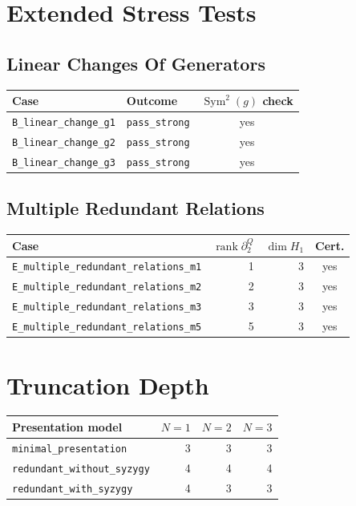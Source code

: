 \documentclass[11pt]{article}
\begin{document}
\section{Extended Stress Tests}
\subsection{Linear Changes Of Generators}
\begin{center}
\begin{tabular}{llc}
\toprule
Case & Outcome & \(\operatorname{Sym}^2(g)\) check \\
\midrule
\texttt{B\_linear\_change\_g1} & \texttt{pass\_strong} & yes \\
\texttt{B\_linear\_change\_g2} & \texttt{pass\_strong} & yes \\
\texttt{B\_linear\_change\_g3} & \texttt{pass\_strong} & yes \\
\bottomrule
\end{tabular}
\end{center}

\subsection{Multiple Redundant Relations}
\begin{center}
\begin{tabular}{lrrc}
\toprule
Case & \(\operatorname{rank}\partial_2^Q\) & \(\dim H_1\) & Cert. \\
\midrule
\texttt{E\_multiple\_redundant\_relations\_m1} & 1 & 3 & yes \\
\texttt{E\_multiple\_redundant\_relations\_m2} & 2 & 3 & yes \\
\texttt{E\_multiple\_redundant\_relations\_m3} & 3 & 3 & yes \\
\texttt{E\_multiple\_redundant\_relations\_m5} & 5 & 3 & yes \\
\bottomrule
\end{tabular}
\end{center}

\section{Truncation Depth}
\begin{center}
\begin{tabular}{lrrr}
\toprule
Presentation model & \(N=1\) & \(N=2\) & \(N=3\) \\
\midrule
\texttt{minimal\_presentation} & 3 & 3 & 3 \\
\texttt{redundant\_without\_syzygy} & 4 & 4 & 4 \\
\texttt{redundant\_with\_syzygy} & 4 & 3 & 3 \\
\bottomrule
\end{tabular}
\end{center}
\end{document}
